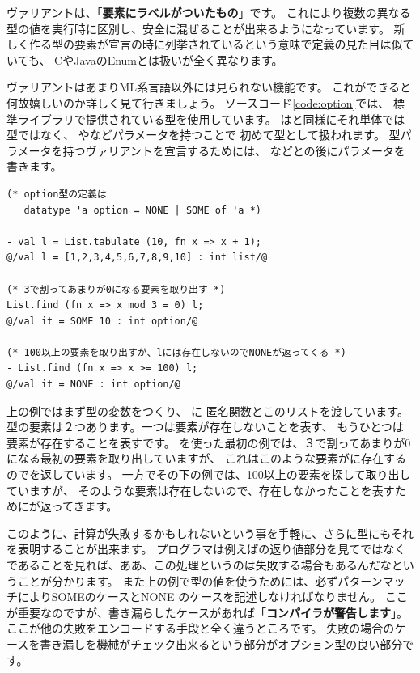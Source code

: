 \documentclass[11pt,a4paper]{jarticle}
\begin{document}
ヴァリアントは、「\textbf{要素にラベルがついたもの}」です。
これにより複数の異なる型の値を実行時に区別し、安全に混ぜることが出来るようになっています。
新しく作る型の要素が宣言の時に列挙されているという意味で定義の見た目は似ていても、
CやJavaのEnumとは扱いが全く異なります。

ヴァリアントはあまりML系言語以外には見られない機能です。
これができると何故嬉しいのか詳しく見て行きましょう。
ソースコード\ref{code:option}では、
標準ライブラリで提供されている型を使用しています。
はと同様にそれ単体では型ではなく、
やなどパラメータを持つことで
初めて型として扱われます。
型パラメータを持つヴァリアントを宣言するためには、
などとの後にパラメータを書きます。

\begin{lstlisting}[caption=オプション型,label=code:option]
(* option型の定義は
   datatype 'a option = NONE | SOME of 'a *)

- val l = List.tabulate (10, fn x => x + 1);
@/val l = [1,2,3,4,5,6,7,8,9,10] : int list/@

(* 3で割ってあまりが0になる要素を取り出す *)
List.find (fn x => x mod 3 = 0) l;
@/val it = SOME 10 : int option/@

(* 100以上の要素を取り出すが、lには存在しないのでNONEが返ってくる *)
- List.find (fn x => x >= 100) l;
@/val it = NONE : int option/@
\end{lstlisting}

上の例ではまず型の変数をつくり、
に
匿名関数とこのリストを渡しています。
型の要素は２つあります。一つは要素が存在しないことを表す、
もうひとつは要素が存在することを表すです。
を使った最初の例では、３で割ってあまりが0になる最初の要素を取り出していますが、
これはこのような要素がに存在するのでを返しています。
一方でその下の例では、100以上の要素を探して取り出していますが、
そのような要素は存在しないので、存在しなかったことを表すためにが返ってきます。

このように、計算が失敗するかもしれないという事を手軽に、さらに型にもそれを表明することが出来ます。
プログラマは例えばの返り値部分を見てではなく
であることを見れば、ああ、この処理というのは失敗する場合もあるんだなということが分かります。
また上の例で型の値を使うためには、必ずパターンマッチによりSOMEのケースとNONE
のケースを記述しなければなりません。
ここが重要なのですが、書き漏らしたケースがあれば「{\bfseries コンパイラが警告します}」。
ここが他の失敗をエンコードする手段と全く違うところです。
失敗の場合のケースを書き漏しを機械がチェック出来るという部分がオプション型の良い部分です。
\end{document}
